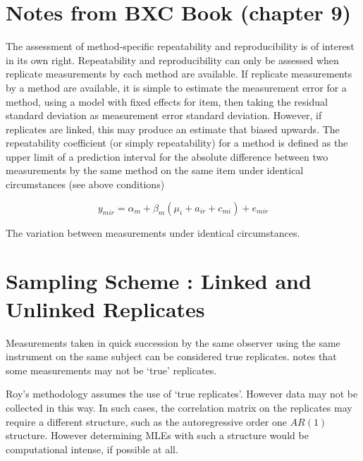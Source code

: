 \documentclass[12pt, a4paper]{report}
\theoremstyle{plain}
\theoremstyle{definition}
\theoremstyle{remark}
\begin{document}
	
	
	
	
	
	
	
	
	
	\newpage
	
	
	\section{Notes from BXC Book (chapter 9)}
	The assessment of method-specific repeatability and reproducibility is of interest in its own right.
	Repeatability and reproducibility can only be assessed when replicate measurements by each method are available.
	If replicate measurements by a method are available, it is simple to estimate the measurement error for a method, using a model with fixed effects for item, then taking the residual standard deviation as measurement error standard deviation.
	However, if replicates are linked, this may produce an estimate that biased upwards.
	The repeatability coefficient (or simply repeatability) for a method is defined as the upper limit of a
	prediction interval for the absolute difference between two measurements by the same method on the same
	item under identical circumstances (see above conditions)
	
	\[y_{mir}  = \alpha_{m} + \beta_m( \mu_i + a_{ir} + c_{mi}) + e_{mir}\]
	
	The variation between measurements under identical circumstances.
	

	
	


	\section{Sampling Scheme : Linked and Unlinked Replicates}
	Measurements taken in quick succession by the same observer using the same instrument on the same subject can be considered true replicates. \citet{ARoy2009} notes that some measurements may not be `true' replicates.
	
	Roy's methodology assumes the use of `true replicates'. However data may not be collected in this way. In such cases, the correlation matrix on the replicates may require a different structure, such as the autoregressive order one $AR(1)$ structure. However determining MLEs with such a structure would be computational intense, if possible at all.
	
\end{document}
